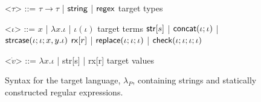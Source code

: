 \documentclass[12pt]{article}
\theoremstyle{definition}
\newcommand{\lambdap}{\lambda_P}
\newcommand{\tcheck}[4]{{\sf check}(#1; #2; #3; #4)}
\renewcommand{\tstr}[1]{{{\sf str}[#1]}}
\newcommand{\preplace}[3]{{\sf replace}(#1;#2;#3)}
\newcommand{\tconcat}[2]{{\sf concat}(#1;#2)} \newcommand{\concat}[2]{{\sf concat}(#1;#2)} %
\newcommand{\rx}[1]{ {\sf rx}[#1] }
\newcommand{\str}{{\sf string}}
\newcommand{\regex}{{\sf regex}}
\newcommand{\pstrcase}[3]{ {\sf strcase}(#1; #2; #3)}
\begin{document}
\begin{figure}[t]
\small
  \begin{grammar}

<$\tau$> ::= $\tau \rightarrow \tau$ | $\str$ | $\regex$ \hfill target types

<$\iota$> ::= $x$ | $\lambda x . \iota$ | $\iota(\iota)$ \hfill target terms \alt
$\tstr{s}$ | $\tconcat{\iota}{\iota}$ | $\pstrcase{\iota}{\iota}{x,y.\iota}$ \alt
  $\rx{r}$ | $\preplace{\iota}{\iota}{\iota}$ | $\tcheck{\iota}{\iota}{\iota}{\iota}$ 

  <$\dot{v}$> ::= $\lambda x . \iota$ | \tstr{s} | \rx{r} \hfill target values

\end{grammar}
\caption{Syntax for the target language, $\lambdap$, containing strings and statically constructed regular expressions.}
\label{fig:lcsSyntax}
\end{figure}
\end{document}
